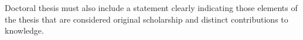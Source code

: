 \begin{prefatory}
\noindent
Doctoral thesis must also include a statement clearly indicating those
elements of the thesis that are considered original scholarship and
distinct contributions to knowledge.

\tableofcontents%
%
%
\end{prefatory}
%
